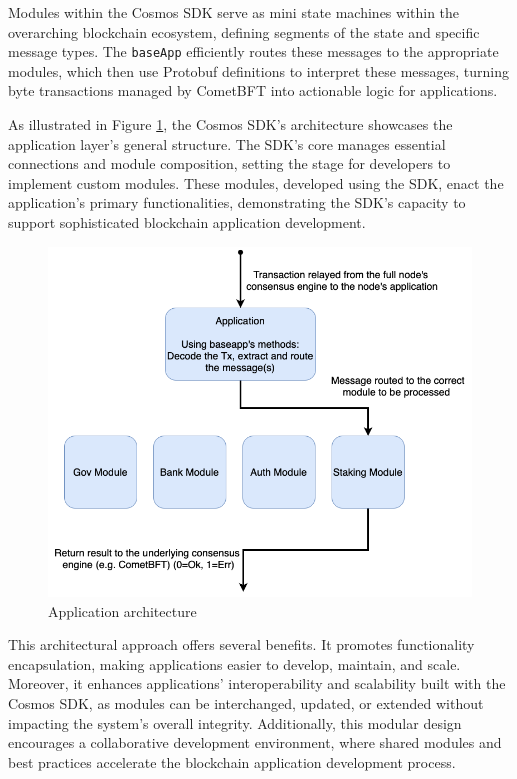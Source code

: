 Modules within the Cosmos SDK serve as mini state machines within the overarching blockchain ecosystem, defining segments of the state and specific message types. The \texttt{baseApp} efficiently routes these messages to the appropriate modules, which then use Protobuf definitions to interpret these messages, turning byte transactions managed by CometBFT into actionable logic for applications.

As illustrated in Figure \ref{fig:application-modules}, the Cosmos SDK's architecture showcases the application layer's general structure. The SDK's core manages essential connections and module composition, setting the stage for developers to implement custom modules. These modules, developed using the SDK, enact the application's primary functionalities, demonstrating the SDK's capacity to support sophisticated blockchain application development.

\begin{figure}[H]
    \centering
    \includegraphics[width=\textwidth]{figures/prueba.png}
    \caption{Application architecture}
    \label{fig:application-modules}
\end{figure}

This architectural approach offers several benefits. It promotes functionality encapsulation, making applications easier to develop, maintain, and scale. Moreover, it enhances applications' interoperability and scalability built with the Cosmos SDK, as modules can be interchanged, updated, or extended without impacting the system's overall integrity. Additionally, this modular design encourages a collaborative development environment, where shared modules and best practices accelerate the blockchain application development process.


